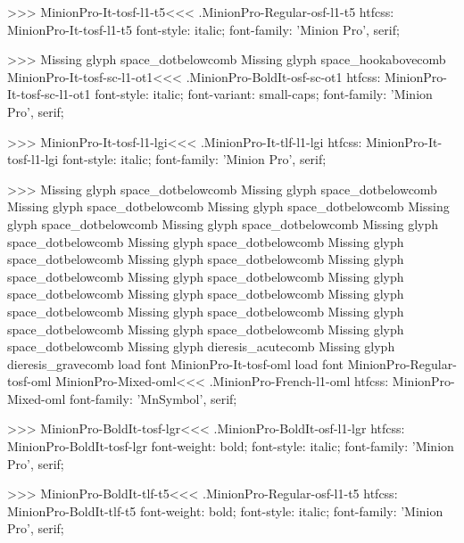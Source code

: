 {>>>
\<MinionPro-It-tosf-l1-t5\><<<
.MinionPro-Regular-osf-l1-t5
htfcss:  MinionPro-It-tosf-l1-t5  font-style: italic; font-family: 'Minion Pro', serif;

>>>
Missing glyph	space_dotbelowcomb
Missing glyph	space_hookabovecomb
\<MinionPro-It-tosf-sc-l1-ot1\><<<
.MinionPro-BoldIt-osf-sc-ot1
htfcss:  MinionPro-It-tosf-sc-l1-ot1  font-style: italic; font-variant: small-caps; font-family: 'Minion Pro', serif;

>>>
\<MinionPro-It-tosf-l1-lgi\><<<
.MinionPro-It-tlf-l1-lgi
htfcss:  MinionPro-It-tosf-l1-lgi  font-style: italic; font-family: 'Minion Pro', serif;

>>>
Missing glyph	space_dotbelowcomb
Missing glyph	space_dotbelowcomb
Missing glyph	space_dotbelowcomb
Missing glyph	space_dotbelowcomb
Missing glyph	space_dotbelowcomb
Missing glyph	space_dotbelowcomb
Missing glyph	space_dotbelowcomb
Missing glyph	space_dotbelowcomb
Missing glyph	space_dotbelowcomb
Missing glyph	space_dotbelowcomb
Missing glyph	space_dotbelowcomb
Missing glyph	space_dotbelowcomb
Missing glyph	space_dotbelowcomb
Missing glyph	space_dotbelowcomb
Missing glyph	space_dotbelowcomb
Missing glyph	space_dotbelowcomb
Missing glyph	space_dotbelowcomb
Missing glyph	space_dotbelowcomb
Missing glyph	space_dotbelowcomb
Missing glyph	dieresis_acutecomb
Missing glyph	dieresis_gravecomb
load font	MinionPro-It-tosf-oml
load font	MinionPro-Regular-tosf-oml
\<MinionPro-Mixed-oml\><<<
.MinionPro-French-l1-oml
htfcss:  MinionPro-Mixed-oml  font-family: 'MnSymbol', serif;

>>>
\<MinionPro-BoldIt-tosf-lgr\><<<
.MinionPro-BoldIt-osf-l1-lgr
htfcss:  MinionPro-BoldIt-tosf-lgr  font-weight: bold; font-style: italic; font-family: 'Minion Pro', serif;

>>>
\<MinionPro-BoldIt-tlf-t5\><<<
.MinionPro-Regular-osf-l1-t5
htfcss:  MinionPro-BoldIt-tlf-t5  font-weight: bold; font-style: italic; font-family: 'Minion Pro', serif;

}
